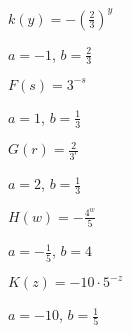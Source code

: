 \begin{exercises}
\begin{problem}
\begin{multicols}{4}
\begin{subproblem}
		$k(y)= -\left( \frac{2}{3} \right)^y$
		\begin{shortsolution}
			$a=-1$, $b=\frac{2}{3}$ 
		\end{shortsolution}
	\end{subproblem}
	\begin{subproblem}
		$F(s)=3^{-s}$
		\begin{shortsolution}
			$a=1$, $b=\frac{1}{3}$ 
		\end{shortsolution}
	\end{subproblem}
	\begin{subproblem}
		$G(r)=\frac{2}{3^r}$
		\begin{shortsolution}
			$a=2$, $b=\frac{1}{3}$ 
		\end{shortsolution}
	\end{subproblem}
	\begin{subproblem}
		$H(w)=-\frac{4^w}{5}$
		\begin{shortsolution}
			$a=-\frac{1}{5}$, $b=4$ 
		\end{shortsolution}
	\end{subproblem}
	\begin{subproblem}
		$K(z)=-10\cdot 5^{-z}$
		\begin{shortsolution}
			$a=-10$, $b=\frac{1}{5}$ 
		\end{shortsolution}
	\end{subproblem}
\end{multicols}
\end{problem}


\end{exercises}
